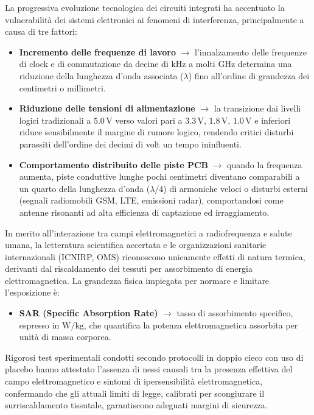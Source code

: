 La progressiva evoluzione tecnologica dei circuiti integrati ha accentuato la vulnerabilità dei sistemi elettronici ai fenomeni di interferenza, principalmente a causa di tre fattori:
\begin{itemize}
    \item \textbf{Incremento delle frequenze di lavoro} $\rightarrow$ l'innalzamento delle frequenze di clock e di commutazione da decine di $\text{kHz}$ a molti $\text{GHz}$ determina una riduzione della lunghezza d'onda associata ($\lambda$) fino all'ordine di grandezza dei centimetri o millimetri.
    \item \textbf{Riduzione delle tensioni di alimentazione} $\rightarrow$ la transizione dai livelli logici tradizionali a $5.0\,\text{V}$ verso valori pari a $3.3\,\text{V}$, $1.8\,\text{V}$, $1.0\,\text{V}$ e inferiori riduce sensibilmente il margine di rumore logico, rendendo critici disturbi parassiti dell'ordine dei decimi di volt un tempo ininfluenti.
    \item \textbf{Comportamento distribuito delle piste PCB} $\rightarrow$ quando la frequenza aumenta, piste conduttive lunghe pochi centimetri diventano comparabili a un quarto della lunghezza d'onda ($\lambda/4$) di armoniche veloci o disturbi esterni (segnali radiomobili GSM, LTE, emissioni radar), comportandosi come antenne risonanti ad alta efficienza di captazione ed irraggiamento.
\end{itemize}

In merito all'interazione tra campi elettromagnetici a radiofrequenza e salute umana, la letteratura scientifica accertata e le organizzazioni sanitarie internazionali (ICNIRP, OMS) riconoscono unicamente effetti di natura termica, derivanti dal riscaldamento dei tessuti per assorbimento di energia elettromagnetica. La grandezza fisica impiegata per normare e limitare l'esposizione è:
\begin{itemize}
    \item \textbf{SAR (Specific Absorption Rate)} $\rightarrow$ tasso di assorbimento specifico, espresso in $\text{W/kg}$, che quantifica la potenza elettromagnetica assorbita per unità di massa corporea.
\end{itemize}
Rigorosi test sperimentali condotti secondo protocolli in doppio cieco con uso di placebo hanno attestato l'assenza di nessi causali tra la presenza effettiva del campo elettromagnetico e sintomi di ipersensibilità elettromagnetica, confermando che gli attuali limiti di legge, calibrati per scongiurare il surriscaldamento tissutale, garantiscono adeguati margini di sicurezza.

